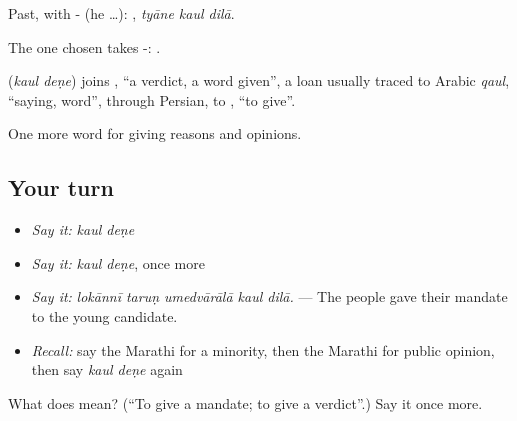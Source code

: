 Past, with - (he …):   , \emph{tyāne kaul dilā}.

The one chosen takes -:   .

\begin{cousinweb}
\textbf{ } (\emph{kaul deṇe}) joins , \textquotedblleft{}a verdict, a word given\textquotedblright{}, a loan usually traced to Arabic \emph{qaul}, \textquotedblleft{}saying, word\textquotedblright{}, through Persian, to , \textquotedblleft{}to give\textquotedblright{}.
\end{cousinweb}

\begin{grammarlens}[title={What you've built}]
One more word for giving reasons and opinions.
\end{grammarlens}

\subsection*{Your turn}
\begin{itemize}
\raggedright
  \item \emph{Say it:} \emph{kaul deṇe}
  \item \emph{Say it:} \emph{kaul deṇe}, once more
  \item \emph{Say it:} \emph{lokānnī taruṇ umedvārālā kaul dilā.} — The people gave their mandate to the young candidate.
  \item \emph{Recall:} say the Marathi for a minority, then the Marathi for public opinion, then say \emph{kaul deṇe} again
\end{itemize}

\begin{tcolorbox}[breakable,colback=teal!4,colframe=teal!35!black,title={Before you move on}]
What does   mean? (\textquotedblleft{}To give a mandate; to give a verdict\textquotedblright{}.) Say it once more.
\end{tcolorbox}
